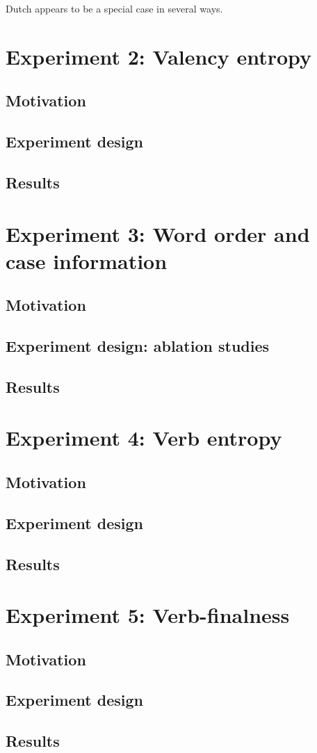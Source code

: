 Dutch appears to be a special case in several ways. 



\section{Experiment 2: Valency entropy}
\subsection{Motivation}
\subsection{Experiment design}
\subsection{Results}

\section{Experiment 3: Word order and case information}
\subsection{Motivation}
\subsection{Experiment design: ablation studies}
\subsection{Results}

\section{Experiment 4: Verb entropy}
\subsection{Motivation}
\subsection{Experiment design}
\subsection{Results}

\section{Experiment 5: Verb-finalness}
\subsection{Motivation}
\subsection{Experiment design}
\subsection{Results}
